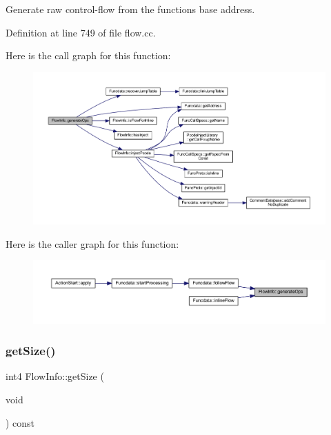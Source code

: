 Generate raw control-\/flow from the function\textquotesingle{}s base address. 



Definition at line 749 of file flow.\+cc.

Here is the call graph for this function\+:
\nopagebreak
\begin{figure}[H]
\begin{center}
\leavevmode
\includegraphics[width=350pt]{class_flow_info_afe680152d016a3ec80e155f3ea85f26c_cgraph}
\end{center}
\end{figure}
Here is the caller graph for this function\+:
\nopagebreak
\begin{figure}[H]
\begin{center}
\leavevmode
\includegraphics[width=350pt]{class_flow_info_afe680152d016a3ec80e155f3ea85f26c_icgraph}
\end{center}
\end{figure}
\mbox{\label{class_flow_info_ac233a410fc8046f112adfc20c5507984}} 
\subsubsection{\texorpdfstring{getSize()}{getSize()}}
{\footnotesize\ttfamily int4 Flow\+Info\+::get\+Size (\begin{DoxyParamCaption}\item[{void}]{ }\end{DoxyParamCaption}) const\hspace{0.3cm}{\ttfamily [inline]}}



